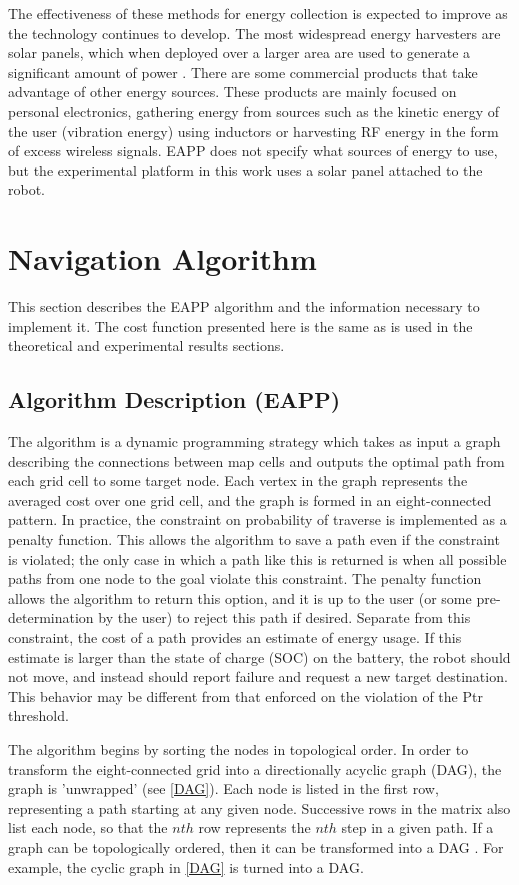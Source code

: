 \documentclass[journal]{IEEEtran}
\newcounter{row}
\newcounter{col}
\begin{document}
The effectiveness of these methods for energy collection is expected to improve as the technology continues to develop. 
The most widespread energy harvesters are solar panels, which when deployed over a larger area are used to generate a significant amount of power \cite{DoE citation here}. 
There are some commercial products that take advantage of other energy sources. 
These products are mainly focused on personal electronics, gathering energy from sources such as the kinetic energy of the user (vibration energy) using inductors or harvesting RF energy in the form of excess wireless signals. 
EAPP does not specify what sources of energy to use, but the experimental platform in this work uses a solar panel attached to the robot.

\section{Navigation Algorithm}
This section describes the EAPP algorithm and the information necessary to implement it. The cost function presented here is the same as is used in the theoretical and experimental results sections.

\subsection{Algorithm Description (EAPP)}
The algorithm is a dynamic programming strategy which takes as input a graph describing the connections between map cells and outputs the optimal path from each grid cell to some target node. 
Each vertex in the graph represents the averaged cost over one grid cell, and the graph is formed in an eight-connected pattern. 
In practice, the constraint on probability of traverse is implemented as a penalty function. 
This allows the algorithm to save a path even if the constraint is violated; the only case in which a path like this is returned is when all possible paths from one node to the goal violate this constraint. 
The penalty function allows the algorithm to return this option, and it is up to the user (or some pre-determination by the user) to reject this path if desired. 
Separate from this constraint, the cost of a path provides an estimate of energy usage. 
If this estimate is larger than the state of charge (SOC) on the battery, the robot should not move, and instead should report failure and request a new target destination. 
This behavior may be different from that enforced on the violation of the Ptr threshold.

The algorithm begins by sorting the nodes in topological order. 
In order to transform the eight-connected grid into a directionally acyclic graph (DAG), the graph is 'unwrapped' (see \ref{DAG}).
Each node is listed in the first row, representing a path starting at any given node. 
Successive rows in the matrix also list each node, so that the $nth$ row represents the $nth$ step in a given path. 
If a graph can be topologically ordered, then it can be transformed into a DAG \cite{vazirani algorithms ch. 6}. For example, the cyclic graph in \ref{DAG} is turned into a DAG.
\end{document}
